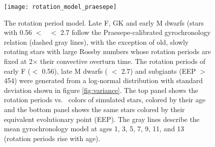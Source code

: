 \begin{figure}
  \caption{
The rotation period model.
    Late F, GK and early M dwarfs (stars with 0.56 $<$ \gcolor\ $<$ 2.7 follow
    the Praesepe-calibrated gyrochronology relation (dashed gray lines), with
    the exception of old, slowly
    rotating stars with large Rossby numbers whose rotation periods are fixed
    at 2$\times$ their convective overturn time.
    The rotation periods of early F (\gcolor $<$ 0.56), late M dwarfs (\gcolor
    $<$ 2.7) and subgiants (EEP $>$ 454) were generated
    from a log-normal distribution with standard deviation shown in figure
    \ref{fig:variance}.
The top panel shows the rotation periods vs. \gcolor\ colors of simulated stars,
    colored by their age and the bottom panel shows the same stars colored
    by their equivalent evolutionary point (EEP).
    The gray lines describe the mean gyrochronology model at ages 1,
    3, 5, 7, 9, 11, and 13 (rotation periods rise with age).
}
  \centering
    \texttt{[image: rotation\_model\_praesepe]}
\label{fig:rotation_model}
\end{figure}

